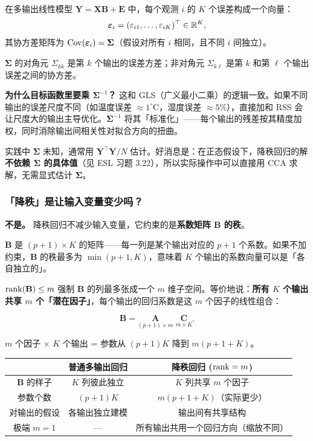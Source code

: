 在多输出线性模型 $\mathbf{Y} = \mathbf{X}\mathbf{B} + \mathbf{E}$ 中，每个观测 $i$ 的 $K$ 个误差构成一个向量：
\[
    \bm{\varepsilon}_i = (\varepsilon_{i1}, \dots, \varepsilon_{iK})^\top \in \mathbb{R}^K,
\]
其协方差矩阵为 $\mathrm{Cov}(\bm{\varepsilon}_i) = \bm{\Sigma}$（假设对所有 $i$ 相同，且不同 $i$ 间独立）。

$\bm{\Sigma}$ 的对角元 $\Sigma_{kk}$ 是第 $k$ 个输出的误差方差；非对角元 $\Sigma_{k\ell}$ 是第 $k$ 和第 $\ell$ 个输出误差之间的协方差。

\textbf{为什么目标函数里要乘 $\bm{\Sigma}^{-1}$？} 这和 GLS（广义最小二乘）的逻辑一致。如果不同输出的误差尺度不同（如温度误差 $\approx 1^\circ$C，湿度误差 $\approx 5\%$），直接加和 RSS 会让尺度大的输出主导优化。$\bm{\Sigma}^{-1}$ 将其「标准化」——每个输出的残差按其精度加权，同时消除输出间相关性对拟合方向的扭曲。

实践中 $\bm{\Sigma}$ 未知，通常用 $\mathbf{Y}^\top \mathbf{Y}/N$ 估计。好消息是：在正态假设下，降秩回归的解\textbf{不依赖 $\bm{\Sigma}$ 的具体值}（见 ESL 习题 3.22），所以实际操作中可以直接用 CCA 求解，无需显式估计 $\bm{\Sigma}$。

\subsubsection{「降秩」是让输入变量变少吗？}

\textbf{不是。} 降秩回归不减少输入变量，它约束的是\textbf{系数矩阵 $\mathbf{B}$ 的秩}。

$\mathbf{B}$ 是 $(p+1) \times K$ 的矩阵——每一列是某个输出对应的 $p+1$ 个系数。如果不加约束，$\mathbf{B}$ 的秩最多为 $\min(p+1, K)$，意味着 $K$ 个输出的系数向量可以是「各自独立的」。

$\operatorname{rank}(\mathbf{B}) \le m$ 强制 $\mathbf{B}$ 的列最多张成一个 $m$ 维子空间。等价地说：\textbf{所有 $K$ 个输出共享 $m$ 个「潜在因子」}，每个输出的回归系数是这 $m$ 个因子的线性组合：

\[
    \mathbf{B} = \underset{(p+1) \times m}{\mathbf{A}} \;
                \underset{m \times K}{\mathbf{C}}.
\]

$m$ 个因子 $\times$ $K$ 个输出 = 参数从 $(p+1)K$ 降到 $m(p+1+K)$。

\begin{center}
\begin{tabular}{c|c|c}
\toprule
& \textbf{普通多输出回归} & \textbf{降秩回归 ($\operatorname{rank}=m$)} \\
\midrule
$\mathbf{B}$ 的样子 & $K$ 列彼此独立 & $K$ 列共享 $m$ 个因子 \\
参数个数 & $(p+1)K$ & $m(p+1+K)$（实际更少） \\
对输出的假设 & 各输出独立建模 & 输出间有共享结构 \\
极端 $m=1$   & — & 所有输出共用一个回归方向（缩放不同） \\
\bottomrule
\end{tabular}
\end{center}

